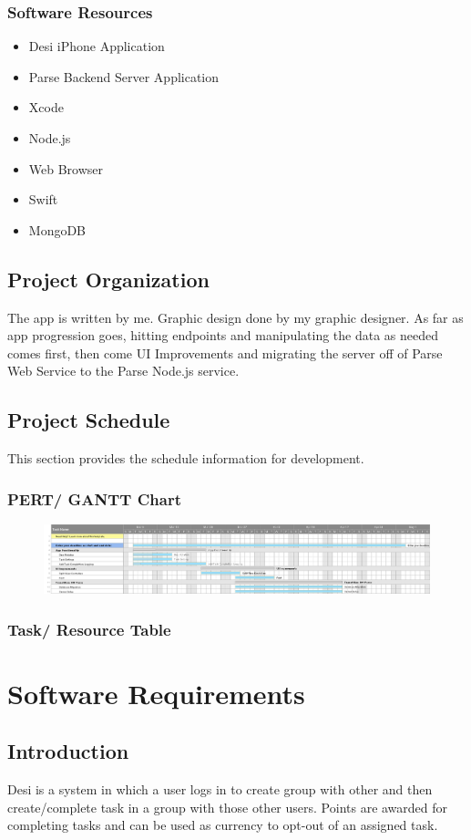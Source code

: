\documentclass[11pt, a4paper]{report}
\begin{document}
\subsection{Software Resources}
\begin{itemize}
\item Desi iPhone Application
\item Parse Backend Server Application
\item Xcode
\item Node.js
\item Web Browser
\item Swift
\item MongoDB
\end{itemize}

\section{Project Organization}
The app is written by me. Graphic design done by my graphic designer. As far as app progression goes, hitting endpoints and manipulating the data as needed comes first, then come UI Improvements and migrating the server off of Parse Web Service to the Parse Node.js service.
\section{Project Schedule}
This section provides the schedule information for development.
\subsection{PERT/ GANTT Chart}
\begin{figure}[H]
\centering
\includegraphics[width=1.0\textwidth]{DesiGantt.png}
\end{figure}
\subsection{Task/ Resource Table}

\chapter{Software Requirements}

\section{Introduction}
Desi is a system in which a user logs in to create group with other and then create/complete task in a group with those other users. Points are awarded for completing tasks and can be used as currency to opt-out of an assigned task.
\end{document}

